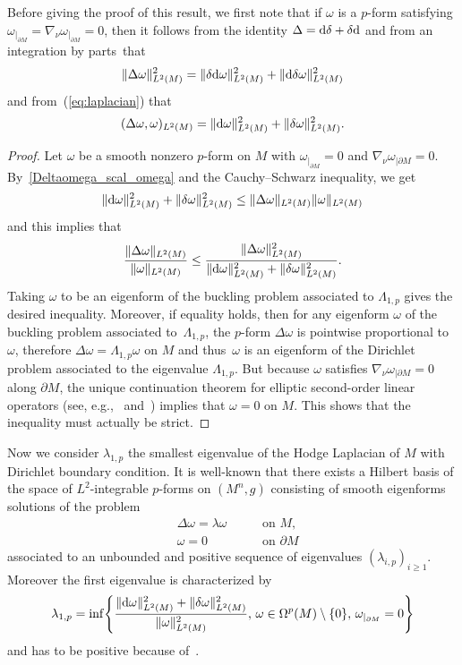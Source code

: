 \documentclass[10pt,a4paper]{amsart}
\numberwithin{equation}{section}
\theoremstyle{definition}
\begin{document}
Before giving the proof of this result, we first note that if $\omega$ is a $p$-form satisfying $\omega_{|_{\partial M}}=\nabla_\nu \omega_{|_{\partial M}}=0$, then it follows from the identity $\Delta={\rm d}\delta+\delta {\rm d}$ and from an integration by parts~that
\[%
\|\Delta \omega \|^2_{L^2(M)} = \|\delta {\rm d}\omega \|^2_{L^2( M)}+\|{\rm d}\delta\omega \|^2_{L^2(M)}
\]
and from~(\ref{eq:laplacian}) that
\begin{equation}\label{Deltaomega_scal_omega}
(\Delta \omega,\omega)_{L^2( M)} = \|{\rm d}\omega \|^2_{L^2( M)}+\|\delta\omega \|^2_{L^2(M)}.
\end{equation}

\begin{proof} Let $\omega$ be a smooth nonzero $p$-form on $M$ with $\omega_{|_{\partial M}}=0$ and $\nabla_\nu\omega_{|\partial M}=0$. By~\eqref{Deltaomega_scal_omega} and the Cauchy--Schwarz inequality, we get
\[
\|{\rm d}\omega \|^2_{L^2( M)}+\|\delta\omega \|^2_{L^2( M)}\leq\| \Delta \omega\|_{L^2( M)} \| \omega\|_{L^2( M)}
\]
and this implies that
\[
\frac{\| \Delta \omega\|_{L^2( M)}}{\|\omega\|_{L^2(M)}}\leq\frac{\| \Delta \omega\|_{L^2( M)}^2}{\|{\rm d}\omega \|^2_{L^2( M)}+\|\delta\omega \|^2_{L^2( M)}}.
\]
Taking $\omega$ to be an eigenform of the buckling problem associated to $\Lambda_{1,p}$ gives the desired inequality. Moreover, if equality holds, then for any eigenform $\omega$ of the buckling problem associated to~$\Lambda_{1,p}$, the $p$-form $\Delta\omega$ is pointwise proportional to $\omega$, therefore $\Delta\omega=\Lambda_{1,p}\omega$ on $M$ and thus~$\omega$ is an eigenform of the Dirichlet problem associated to the eigenvalue $\Lambda_{1,p}$.
But because $\omega$ satisfies $\nabla_\nu\omega_{|\partial M}=0$ along $\partial M$, the unique continuation theorem for elliptic second-order linear operators (see, e.g.,~\cite[Theorem~1.4]{Salolectnotes2014} and~\cite[Chapter~VIII]{HoermanderlinearI}) implies that $\omega=0$ on $M$. This shows that the inequality must actually be strict.
\end{proof}

Now we consider $\lambda_{1,p}$ the smallest eigenvalue of the Hodge Laplacian of $M$ with Dirichlet boundary condition.
It is well-known that there exists a Hilbert basis of the space of $L^2$-integrable $p$-forms on $(M^n,g)$ consisting of smooth eigenforms solutions of the problem
\begin{equation}\label{DirichletBC}
\begin{aligned}
&\Delta \omega =\lambda \omega \ \quad&&\textrm{on } M,\\
&\omega=0\ \quad &&\textrm{on }\partial M
\end{aligned}
\end{equation}
associated to an unbounded and positive sequence of eigenvalues $(\lambda_{i,p})_{i\geq 1}$. Moreover the first eigenvalue is characterized by
\[
\lambda_{1,p}=\inf\Biggl\{\frac{\|{\rm d}\omega\|_{L^2(M)}^2+\|\delta\omega\|_{L^2(M)}^2}{\|\omega\|_{L^2(M)}^2},\, \omega\in\Omega^p(M)\setminus\{0\},\, \omega_{|_{\partial M}}=0\Biggr\}
\]
and has to be positive because of~\cite{Anne89}.
\end{document}
